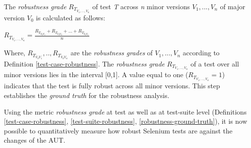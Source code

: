 \theoremstyle{definition}

\begin{definition}{The \textit{
robustness grade} ${R_{T_{V_1,...,V_n}}}$ of test \textit{T} across \textit{n} minor versions \textit{$V_1,...,V_n$} of major version \textit{$V_{0}$} is calculated as follows:}
\begin{center}
\vspace{0.5cm}
${R_{T_{V_1,...,V_n}}} = \displaystyle \frac{R_{T_{V_{0}V_{1}}} + R_{T_{V_{0}V_{2}}} + ... + R_{T_{V_{0}V_{n}}}}{n}$ \normalsize
\newline
\newline
\newline
\end{center}
\label{robustness-ground-truth}  
\end{definition} 


Where, \textit{$R_{T_{V_{0}V_{1}}},..,R_{T_{V_{0}V_{n}}}$} are the 
\textit{robustness grades} of \textit{$V_1,...,V_n$} according to Definition \ref{test-case-robustness}. The \textit{robustness grade} ${R_{T_{V_1,...,V_n}}}$ of a test over all minor versions lies in the interval [0,1]. A value equal to one (${R_{T_{V_1,...,V_n}}}=1$) indicates that the test is fully robust across all minor versions. This step establishes the \textit{ground truth} for the robustness analysis. 

Using the metric \textit{robustness grade} at test as well as at test-suite level (Definitions \ref{test-case-robustness}, \ref{test-suite-robustness}, \ref{robustness-ground-truth}), it is now possible to quantitatively measure how robust Selenium tests are against the changes of the AUT. 

